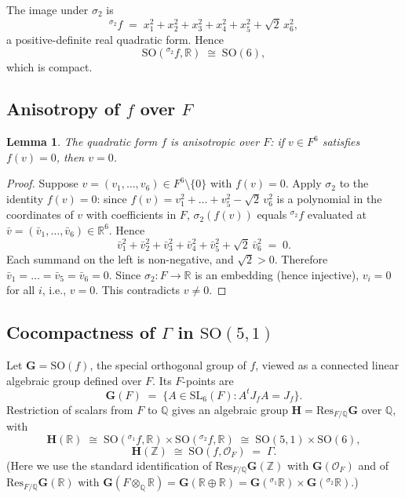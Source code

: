 \documentclass[12pt]{article}
\newtheorem{lemma}[theorem]{Lemma}
\theoremstyle{definition}
\begin{document}
The image under $\sigma_2$ is
\[
{}^{\sigma_2}\!f \;=\; x_1^2+x_2^2+x_3^2+x_4^2+x_5^2+\sqrt{2}\,x_6^2,
\]
a positive-definite real quadratic form. Hence
\[
\mathrm{SO}({}^{\sigma_2}\!f,\mathbb{R}) \;\cong\; \mathrm{SO}(6),
\]
which is compact.

\subsection{Anisotropy of $f$ over $F$}

\begin{lemma}\label{lem:anisotropic}
The quadratic form $f$ is anisotropic over $F$: if $v\in F^6$ satisfies $f(v)=0$, then $v=0$.
\end{lemma}

\begin{proof}
Suppose $v=(v_1,\dots,v_6)\in F^6\setminus\{0\}$ with $f(v)=0$. Apply $\sigma_2$ to the identity $f(v)=0$: since $f(v)=v_1^2+\dots+v_5^2-\sqrt{2}\,v_6^2$ is a polynomial in the coordinates of $v$ with coefficients in $F$, $\sigma_2(f(v))$ equals ${}^{\sigma_2}\!f$ evaluated at $\bar v=(\bar v_1,\dots,\bar v_6)\in\mathbb{R}^6$. Hence
\[
\bar v_1^2+\bar v_2^2+\bar v_3^2+\bar v_4^2+\bar v_5^2+\sqrt{2}\,\bar v_6^2 \;=\; 0.
\]
Each summand on the left is non-negative, and $\sqrt{2}>0$. Therefore $\bar v_1=\dots=\bar v_5=\bar v_6=0$. Since $\sigma_2:F\to\mathbb{R}$ is an embedding (hence injective), $v_i=0$ for all $i$, i.e., $v=0$. This contradicts $v\neq 0$.
\end{proof}

\subsection{Cocompactness of $\Gamma$ in $\mathrm{SO}(5,1)$}

Let $\mathbf{G}=\mathrm{SO}(f)$, the special orthogonal group of $f$, viewed as a connected linear algebraic group defined over $F$. Its $F$-points are
\[
\mathbf{G}(F) \;=\; \{ A\in\mathrm{SL}_6(F) : A^t J_f A = J_f\}.
\]
Restriction of scalars from $F$ to $\mathbb{Q}$ gives an algebraic group $\mathbf{H}=\mathrm{Res}_{F/\mathbb{Q}}\mathbf{G}$ over $\mathbb{Q}$, with
\[
\mathbf{H}(\mathbb{R}) \;\cong\; \mathrm{SO}({}^{\sigma_1}\!f,\mathbb{R})\times\mathrm{SO}({}^{\sigma_2}\!f,\mathbb{R}) \;\cong\; \mathrm{SO}(5,1)\times\mathrm{SO}(6),
\]
\[
\mathbf{H}(\mathbb{Z}) \;\cong\; \mathrm{SO}(f,\mathcal{O}_F) \;=\; \Gamma.
\]
(Here we use the standard identification of $\mathrm{Res}_{F/\mathbb{Q}}\mathbf{G}(\mathbb{Z})$ with $\mathbf{G}(\mathcal{O}_F)$ and of $\mathrm{Res}_{F/\mathbb{Q}}\mathbf{G}(\mathbb{R})$ with $\mathbf{G}(F\otimes_\mathbb{Q}\mathbb{R})=\mathbf{G}(\mathbb{R}\oplus\mathbb{R})=\mathbf{G}({}^{\sigma_1}\!\mathbb{R})\times\mathbf{G}({}^{\sigma_2}\!\mathbb{R})$.)
\end{document}
